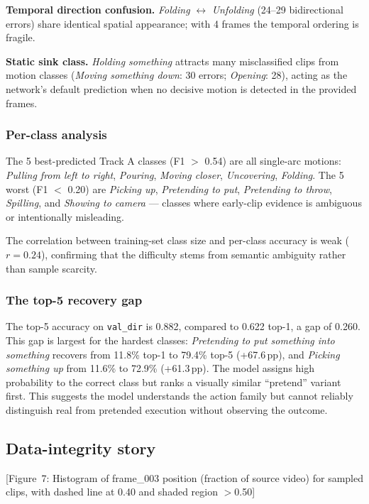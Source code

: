 \documentclass[10pt,twocolumn,letterpaper]{article}
\newcommand{\pp}{\,pp}
\begin{document}
\textbf{Temporal direction confusion.}  \emph{Folding} $\leftrightarrow$
\emph{Unfolding} (24–29 bidirectional errors) share identical spatial
appearance; with 4 frames the temporal ordering is fragile.

\textbf{Static sink class.}  \emph{Holding something} attracts many
misclassified clips from motion classes (\emph{Moving something down}:
30 errors; \emph{Opening}: 28), acting as the network's default prediction
when no decisive motion is detected in the provided frames.

\subsubsection{Per-class analysis}

The 5 best-predicted Track A classes (F1 $>$ 0.54) are all single-arc
motions: \emph{Pulling from left to right}, \emph{Pouring}, \emph{Moving
closer}, \emph{Uncovering}, \emph{Folding}.  The 5 worst (F1 $<$ 0.20)
are \emph{Picking up}, \emph{Pretending to put}, \emph{Pretending to throw},
\emph{Spilling}, and \emph{Showing to camera} — classes where early-clip
evidence is ambiguous or intentionally misleading.

The correlation between training-set class size and per-class accuracy is
weak ($r{=}0.24$), confirming that the difficulty stems from semantic
ambiguity rather than sample scarcity.

\subsubsection{The top-5 recovery gap}

The top-5 accuracy on \texttt{val\_dir} is 0.882, compared to 0.622 top-1,
a gap of 0.260.  This gap is largest for the hardest classes:
\emph{Pretending to put something into something} recovers from 11.8\%
top-1 to 79.4\% top-5 (+67.6\pp), and \emph{Picking something up} from
11.6\% to 72.9\% (+61.3\pp).  The model assigns high probability to the
correct class but ranks a visually similar ``pretend'' variant first.
This suggests the model understands the action family but cannot reliably
distinguish real from pretended execution without observing the outcome.

\subsection{Data-integrity story}
\label{sec:integrity}

[Figure~7: Histogram of frame\_003 position (fraction of source video)
for sampled clips, with dashed line at 0.40 and shaded region $>$0.50]
\end{document}
